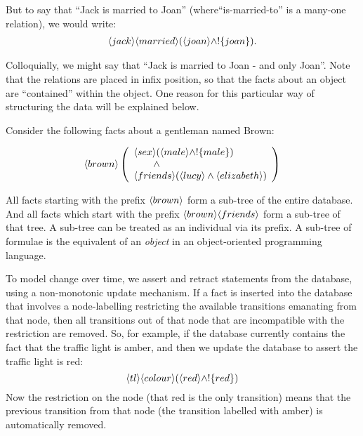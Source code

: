 \NI But to say that ``Jack is married to Joan''
(where``is-married-to'' is a many-one relation), we would write:
\begin{eqnarray*}
  \langle jack \rangle \langle married \rangle (\langle joan \rangle \land ! \{joan\}).
\end{eqnarray*}

\NI Colloquially, we might say that ``Jack is married to Joan - and
only Joan''.  Note that the relations are placed in infix position, so
that the facts about an object are ``contained'' within the object.
One reason for this particular way of structuring the data will be
explained below.
 

Consider the following facts about a gentleman named Brown:

\[
   \langle brown \rangle \left(
   \begin{array}{l}
     \langle sex \rangle (\langle male \rangle \land ! \{male\}) \\
        \qquad \land \\
     \langle friends \rangle (\langle lucy \rangle \land \langle elizabeth \rangle ) 
   \end{array}
   \right)
\]

\NI All facts  starting with the prefix $\MAY{brown}$ form a
sub-tree of the entire database.  And all  facts which start with
the prefix $\MAY{brown} \MAY{friends}$ form a sub-tree of that tree.
A sub-tree can be treated as an individual via its prefix.  
A sub-tree of formulae is the \cathoristic{} equivalent of an
\emph{object} in an object-oriented programming language.

To model change over time, we assert and retract statements from the database, using a non-monotonic update mechanism.
If a fact is inserted into the database that involves a node-labelling restricting the available transitions emanating from that node, then all transitions out of that node that are incompatible with the restriction are removed.
So, for example, if the database currently contains the fact that the traffic light is amber, and then we update the database to assert the traffic light is red:
\[
\langle tl \rangle \langle colour \rangle (\langle red \rangle \land !\{red\})
\]
Now the restriction on the node (that red is the only transition) means that the previous transition from that node (the transition labelled with amber) is automatically removed.

